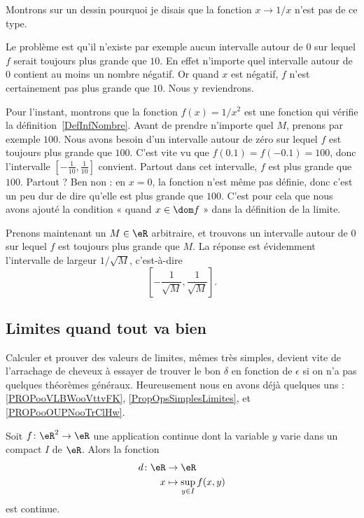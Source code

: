 Montrons sur un dessin pourquoi je disais que la fonction \( x\to 1/x\) n'est pas de ce type.


Le problème est qu'il n'existe par exemple aucun intervalle autour de \( 0\) sur lequel \( f\) serait toujours plus grande que \( 10\). En effet n'importe quel intervalle autour de \( 0\) contient au moins un nombre négatif. Or quand \( x\) est négatif, \( f\) n'est certainement pas plus grande que \( 10\). Nous y reviendrons.

Pour l'instant, montrons que la fonction \( f(x)=1/x^2\) est une fonction qui vérifie la définition~\ref{DefInfNombre}.  Avant de prendre n'importe quel \( M\), prenons par exemple \( 100\). Nous avons besoin d'un intervalle autour de zéro sur lequel \( f\) est toujours plus grande que \( 100\). C'est vite vu que \( f(0.1)=f(-0.1)=100\), donc l'intervalle \( [-\frac{ 1 }{ 10 },\frac{1}{ 10 }]\) convient. Partout dans cet intervalle, \( f\) est plus grande que \( 100\). Partout ? Ben non : en \( x=0\), la fonction n'est même pas définie, donc c'est un peu dur de dire qu'elle est plus grande que \( 100\). C'est pour cela que nous avons ajouté la condition « quand \( x\in\dom f\) » dans la définition de la limite.

Prenons maintenant un \( M\in\eR\) arbitraire, et trouvons un intervalle autour de \( 0\) sur lequel \( f\) est toujours plus grande que \( M\). La réponse est évidemment l'intervalle de largeur \( 1/\sqrt{M}\), c'est-à-dire
\[
	\left[ -\frac{ 1 }{ \sqrt{M} },\frac{ 1 }{ \sqrt{M} } \right].
\]

\subsection{Limites quand tout va bien}


Calculer et prouver des valeurs de limites, mêmes très simples, devient vite de l'arrachage de cheveux à essayer de trouver le bon \( \delta\) en fonction de \( \epsilon\) si on n'a pas quelques théorèmes généraux. Heureusement nous en avons déjà quelques uns : \ref{PROPooVLBWooVttvFK}, \ref{PropOpsSimplesLimites}, et \ref{PROPooOUPNooTrClHw}.

\begin{proposition}      \label{PROPooWXBAooAEweSF}
	Soit \( f\colon \eR^2\to \eR\) une application continue dont la variable \( y\) varie dans un compact \( I\) de \( \eR\). Alors la fonction
	\begin{equation}
		\begin{aligned}
			d\colon \eR & \to \eR                      \\
			x           & \mapsto \sup_{y\in I} f(x,y)
		\end{aligned}
	\end{equation}
	est continue.
\end{proposition}

